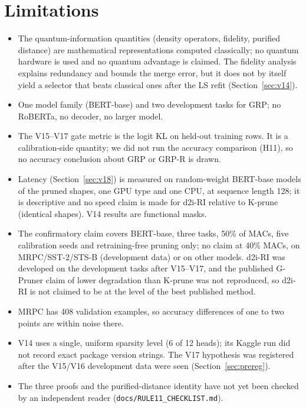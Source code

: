 \documentclass[11pt]{article}
\begin{document}
\section{Limitations}
\begin{itemize}\setlength\itemsep{0pt}
\item The quantum-information quantities (density operators, fidelity, purified distance) are mathematical representations
computed classically; no quantum hardware is used and no quantum advantage is claimed. The fidelity analysis explains redundancy
and bounds the merge error, but it does not by itself yield a selector that beats classical ones after the LS refit
(Section~\ref{sec:v14}).
\item One model family (BERT-base) and two development tasks for GRP; no RoBERTa, no decoder, no larger model.
\item The V15--V17 gate metric is the logit KL on held-out training rows. It is a calibration-side quantity; we
did not run the accuracy comparison (H11), so no accuracy conclusion about GRP or GRP-R is drawn.
\item Latency (Section~\ref{sec:v18}) is measured on random-weight BERT-base models of the pruned shapes, one GPU type and one CPU, at sequence length 128; it is descriptive and no speed claim is made
for d2i-RI relative to K-prune (identical shapes). V14 results are functional masks.
\item The confirmatory claim covers BERT-base, three tasks, 50\% of MACs, five calibration seeds and retraining-free pruning only; no claim at 40\% MACs, on MRPC/SST-2/STS-B (development data) or on other models.
d2i-RI was developed on the development tasks after V15--V17, and the published G-Pruner claim of lower degradation than K-prune was not reproduced, so d2i-RI is not claimed to be at the level of the best published method.
\item MRPC has 408 validation examples, so accuracy differences of one to two points are within noise there.
\item V14 uses a single, uniform sparsity level (6 of 12 heads); its Kaggle run did not record exact package version
strings. The V17 hypothesis was registered after the V15/V16 development data were seen (Section~\ref{sec:prereg}).
\item The three proofs and the purified-distance identity have not yet been checked by an independent reader (\texttt{docs/RULE11\_CHECKLIST.md}).
\end{itemize}
\end{document}
